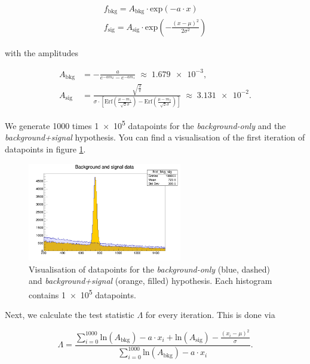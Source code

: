 \documentclass[10pt]{article}
\newenvironment{myfont}{\fontfamily{put}\selectfont}{\par}
\begin{document}
\begin{myfont}
\begin{align}
f_{\textrm{bkg}} = A_{\textrm{bkg}} \cdot \textrm{exp}(- a \cdot x) \\
f_{\textrm{sig}} = A_{\textrm{sig}} \cdot \textrm{exp}\left(-\frac{(x - \mu)^{2}}{2\sigma^{2}}\right)
\end{align}

\noindent with the amplitudes

\begin{align*}
A_{\textrm{bkg}} & = -\frac{a}{e^{-am_{2}} - e^{-am_{1}}} \;\approx\; \num{1.679e-3}, \\
A_{\textrm{sig}} & = \frac{\sqrt{\frac{2}{\pi}}}{\sigma \cdot \left[\textrm{Erf}\left(\frac{\mu - m_{1}}{\sqrt{2}\sigma}\right) - \textrm{Erf}\left(\frac{\mu - m_{2}}{\sqrt{2}\sigma}\right)\right]} \;\approx\; \num{3.131e-2}.
\end{align*}

\noindent We generate \num{1000} times \num{1e5} datapoints for the \textit{background-only} and the \textit{background+signal} hypothesis.
You can find a visualisation of the first iteration of datapoints in figure \ref{fig:ex9_iter}.

\begin{figure}[H]
  \centering
  \includegraphics[width = 0.6\textwidth]{./exercise09_MCdata.png}
  \caption{Visualisation of datapoints for the \textit{background-only} (blue, dashed) and \textit{background+signal} (orange, filled) hypothesis.
  Each histogram contains \num{1e5} datapoints.}
  \label{fig:ex9_iter}
\end{figure}

\noindent Next, we calculate the test statistic $\Lambda$ for every iteration.
This is done via

\begin{equation}
\Lambda = \frac{\sum\limits_{i = 0}^{1000} \textrm{ln}\left(A_{\textrm{bkg}}\right) - a\cdot x_{i} + \textrm{ln}\left(A_{\textrm{sig}}\right) - \frac{(x_{i} - \mu)^{2}}{\sigma}}{\sum\limits_{i = 0}^{1000} \textrm{ln}\left(A_{\textrm{bkg}}\right) - a\cdot x_{i}}.
\end{equation}


\end{myfont}
\end{document}
